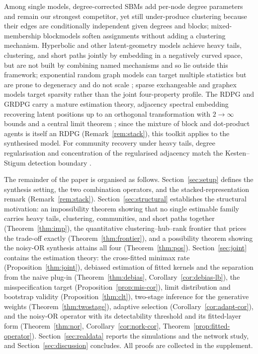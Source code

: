 \documentclass[12pt]{article}
\newcommand{\1}{\mathbf{1}}
\newcommand{\Otoinf}{2\!\to\!\infty}
\begin{document}
Among single models, degree-corrected SBMs \citep{karrer2011stochastic} add per-node degree parameters and remain our strongest competitor, yet still under-produce clustering because their edges are conditionally independent given degrees and blocks; mixed-membership blockmodels \citep{airoldi2008mixed} soften assignments without adding a clustering mechanism. Hyperbolic and other latent-geometry models \citep{krioukov2010hyperbolic,gugelmann2012random,fountoulakis2021clustering} achieve heavy tails, clustering, and short paths jointly by embedding in a negatively curved space, but are not built by combining named mechanisms and so lie outside this framework; exponential random graph models can target multiple statistics but are prone to degeneracy and do not scale \citep{schweinberger2020exponential}; sparse exchangeable and graphex models \citep{caron2017sparse,veitch2015class} target sparsity rather than the joint four-property profile. The RDPG and GRDPG carry a mature estimation theory, adjacency spectral embedding recovering latent positions up to an orthogonal transformation with $\Otoinf$ bounds \citep{lyzinski2014perfect} and a central limit theorem \citep{athreya2016limit,athreya2018statistical,rubin2022statistical}; since the mixture of block and dot-product agents is itself an RDPG (Remark~\ref{rem:stack}), this toolkit applies to the synthesised model. For community recovery under heavy tails, degree regularisation \citep{chaudhuri2012spectral,amini2013pseudo,qin2013regularized,joseph2016impact} and concentration of the regularised adjacency \citep{le2017concentration} match the Kesten--Stigum detection boundary \citep{decelle2011asymptotic,mossel2015reconstruction,abbe2018community,lei2015consistency}.


The remainder of the paper is organised as follows. Section~\ref{sec:setup} defines the synthesis
setting, the two combination operators, and the stacked-representation remark
(Remark~\ref{rem:stack}). Section~\ref{sec:structural} establishes the structural motivation: an impossibility theorem showing that no single estimable family carries heavy tails, clustering, communities, and short paths together (Theorem~\ref{thm:imp}), the quantitative clustering--hub--rank frontier that prices the trade-off exactly (Theorem~\ref{thm:frontier}), and a possibility theorem showing the noisy-OR synthesis attains all four (Theorem~\ref{thm:pos}). Section~\ref{sec:joint} contains the
estimation theory: the cross-fitted minimax rate (Proposition~\ref{thm:joint}), debiased estimation of
fitted kernels and the separation from the naive plug-in (Theorem~\ref{thm:debias},
Corollary~\ref{cor:debias-lb}), the misspecification target (Proposition~\ref{prop:mis-cor}), limit
distribution and bootstrap validity (Proposition~\ref{thm:clt}), two-stage inference for the generative
weights (Theorem~\ref{thm:twostage}), adaptive selection (Corollary~\ref{cor:adapt-cor}), and the
noisy-OR operator with its detectability threshold and its fitted-layer form
(Theorem~\ref{thm:nor}, Corollary~\ref{cor:nork-cor}, Theorem~\ref{prop:fitted-operator}). Section~\ref{sec:realdata} reports the simulations
and the network study, and Section~\ref{sec:discussion} concludes. All proofs are collected in the supplement.
\end{document}
